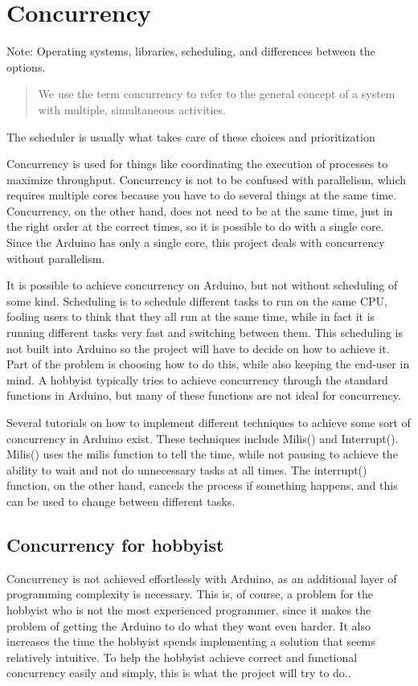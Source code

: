 \section{Concurrency}\label{sec:concurrency}
Note: Operating systems, libraries, scheduling, and differences between the options.


\blockcquote{Bryant2016}{We use the term concurrency to refer to the general concept of a system with
multiple, simultaneous activities.}

The scheduler is usually what takes care of these choices and prioritization

Concurrency is used for things like coordinating the execution of processes to maximize throughput. Concurrency is not to be confused with parallelism, which requires multiple cores because you have to do several things at the same time. Concurrency, on the other hand, does not need to be at the same time, just in the right order at the correct times, so it is possible to do with a single core. Since the Arduino has only a single core, this project deals with concurrency without parallelism.

It is possible to achieve concurrency on Arduino, but not without scheduling of some kind. Scheduling is to schedule different tasks to run on the same CPU, fooling users to think that they all run at the same time, while in fact it is running different tasks very fast and switching between them. This scheduling is not built into Arduino so the project will have to decide on how to achieve it. Part of the problem is choosing how to do this, while also keeping the end-user in mind. A hobbyist typically tries to achieve concurrency through the standard functions in Arduino, but many of these functions are not ideal for concurrency.

Several tutorials on how to implement different techniques to achieve some sort of concurrency in Arduino exist. These techniques include Milis() and Interrupt(). Milis() uses the milis function to tell the time, while not pausing to achieve the ability to wait and not do unnecessary tasks at all times. The interrupt() function, on the other hand, cancels the process if something happens, and this can be used to change between different tasks.


\subsection{Concurrency for hobbyist} 
Concurrency is not achieved effortlessly with Arduino, as an additional layer of programming complexity is necessary. This is, of course, a problem for the hobbyist who is not the most experienced programmer, since it makes the problem of getting the Arduino to do what they want even harder. It also increases the time the hobbyist spends implementing a solution that seems relatively intuitive. To help the hobbyist achieve correct and functional concurrency easily and simply, this is what the project will try to do..